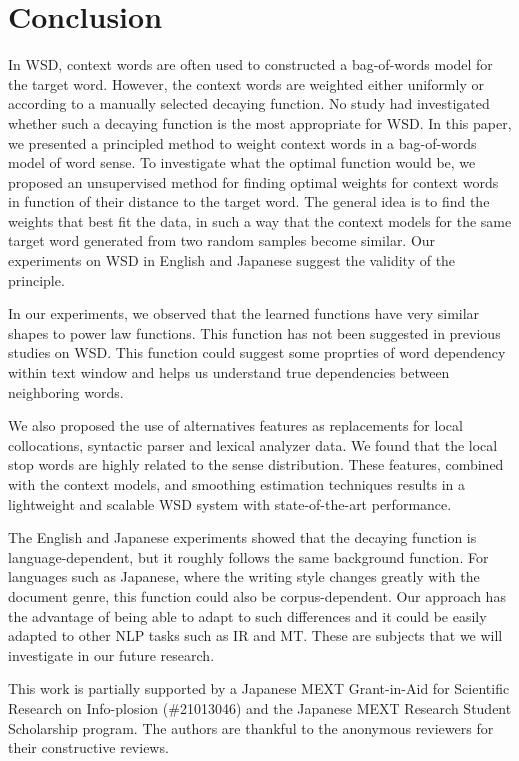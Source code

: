 \documentclass[english]{jnlp_1.4}
\begin{document}
\section{Conclusion}
\label{sec:Conclusion}

In WSD, context words are often used to constructed a bag-of-words
model for the target word. However, the context words are weighted
either uniformly or according to a manually selected decaying function.
No study had investigated whether such a decaying function is the
most appropriate for WSD. In this paper, we presented a principled
method to weight context words in a bag-of-words model of word sense.
To investigate what the optimal function would be, we proposed an
unsupervised method for finding optimal weights for context words
in function of their distance to the target word. The general idea
is to find the weights that best fit the data, in such a way that
the context models for the same target word generated from two random
samples become similar. Our experiments on WSD in English and Japanese
suggest the validity of the principle. 

In our experiments, we observed that the learned functions have very
similar shapes to power law functions. This function has not been
suggested in previous studies on WSD. This function could suggest
some proprties of word dependency within text window and helps us
understand true dependencies between neighboring words.

We also proposed the use of alternatives features as replacements
for local collocations, syntactic parser and lexical analyzer data.
We found that the local stop words are highly related to the sense
distribution. These features, combined with the context models, and
smoothing estimation techniques results in a lightweight and scalable
WSD system with state-of-the-art performance.

The English and Japanese experiments showed that the decaying function
is language-dependent, but it roughly follows the same background
function. For languages such as Japanese, where the writing style
changes greatly with the document genre, this function could also
be corpus-dependent. Our approach has the advantage of being able
to adapt to such differences and it could be easily adapted to other
NLP tasks such as IR and MT. These are subjects that we will investigate
in our future research.


\acknowledgment
This work is partially supported by a Japanese MEXT Grant-in-Aid for
Scientific Research on Info-plosion (\#21013046) and the Japanese
MEXT Research Student Scholarship program. The authors are thankful
to the anonymous reviewers for their constructive reviews.
\end{document}
